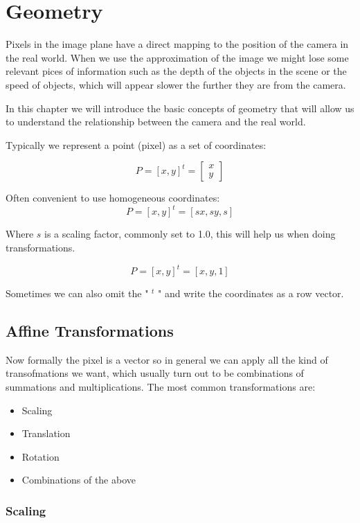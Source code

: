 \chapter{Geometry}

Pixels in the image plane have a direct mapping to the position of the camera in the real world. When we use the approximation of the image we might lose some relevant pices of information such as the depth of the objects in the scene or the speed of objects, which will appear slower the further they are from the camera. 

In this chapter we will introduce the basic concepts of geometry that will allow us to understand the relationship between the camera and the real world.

Typically we represent a point (pixel) as a set of coordinates:

\[ P = [ x, y ]^t = \begin{bmatrix} x \\ y \end{bmatrix}\]

Often convenient to use homogeneous coordinates:
\[ P = [ x, y ]^t = [sx, sy, s]\]

Where \( s \) is a scaling factor, commonly set to 1.0, this will help us when doing transformations.

\[ P = [ x, y ]^t = [x, y, 1]\]

Sometimes we can also omit the " \(^t\) " and write the coordinates as a row vector.

\section{Affine Transformations}

Now formally the pixel is a vector so in general we can apply all the kind of transofmations we want, which usually turn out to be combinations of summations and multiplications. 
The most common transformations are:

\begin{itemize} 
    \item Scaling 
    \item Translation 
    \item Rotation 
    \item Combinations of the above 
\end{itemize}

\subsection{Scaling}

